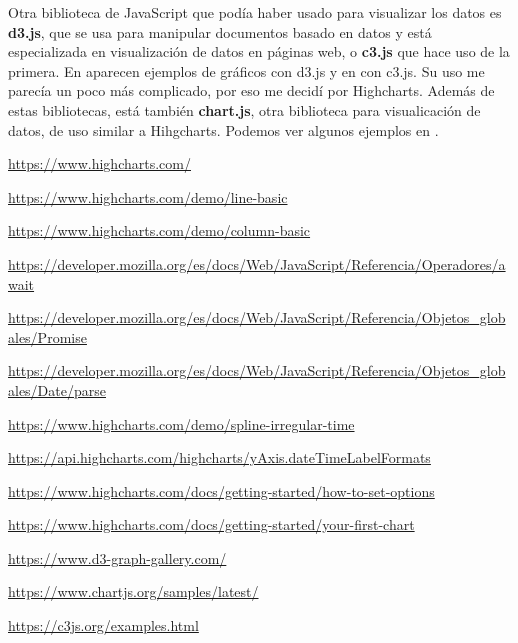 \documentclass[12pt]{article}
\begin{document}
Otra biblioteca de JavaScript que podía haber usado para visualizar los datos es \textbf{d3.js}, que se usa para manipular documentos basado en datos y está especializada en visualización de datos en páginas web, o \textbf{c3.js} que hace uso de la primera. En \cite{11} aparecen ejemplos de gráficos con d3.js y en \cite{13} con c3.js. Su uso me parecía un poco más complicado, por eso me decidí por Highcharts. Además de estas bibliotecas, está también \textbf{chart.js}, otra biblioteca para visualicación de datos, de uso similar a Hihgcharts. Podemos ver algunos ejemplos en \cite{12}.
\newpage
\begin{thebibliography}{10}

{%
\setlength{\parindent}{0cm} %

\url{https://www.highcharts.com/}

\url{https://www.highcharts.com/demo/line-basic}

\url{https://www.highcharts.com/demo/column-basic}

\url{https://developer.mozilla.org/es/docs/Web/JavaScript/Referencia/Operadores/await}

\url{https://developer.mozilla.org/es/docs/Web/JavaScript/Referencia/Objetos_globales/Promise}

\url{https://developer.mozilla.org/es/docs/Web/JavaScript/Referencia/Objetos_globales/Date/parse}

\url{https://www.highcharts.com/demo/spline-irregular-time}

\url{https://api.highcharts.com/highcharts/yAxis.dateTimeLabelFormats}


\url{https://www.highcharts.com/docs/getting-started/how-to-set-options}


\url{https://www.highcharts.com/docs/getting-started/your-first-chart}


\url{https://www.d3-graph-gallery.com/}

\url{https://www.chartjs.org/samples/latest/}

\url{https://c3js.org/examples.html}
}


\end{thebibliography}
\end{document}
